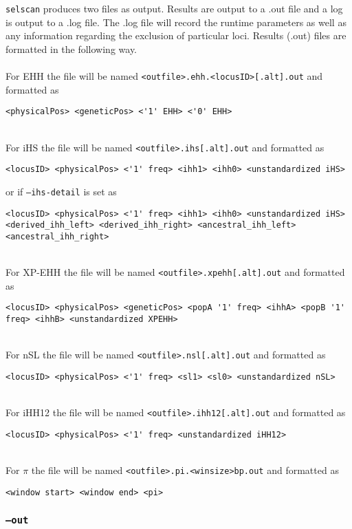 \documentclass[12pt]{article}%
\begin{document}
{\tt selscan} produces two files as output.  Results are output to a .out file and a log is output to a .log file.  The .log file will record the runtime parameters as well as any information regarding the exclusion of particular loci.  Results (.out) files are formatted in the following way.
~\\~\\
For EHH the file will be named {\tt <outfile>.ehh.<locusID>[.alt].out} and formatted as
\begin{lstlisting}
<physicalPos> <geneticPos> <'1' EHH> <'0' EHH>
\end{lstlisting}
~\\
For iHS the file will be named {\tt <outfile>.ihs[.alt].out} and formatted as
\begin{lstlisting}
<locusID> <physicalPos> <'1' freq> <ihh1> <ihh0> <unstandardized iHS>
\end{lstlisting}
or if {\tt --ihs-detail} is set as
\begin{lstlisting}
<locusID> <physicalPos> <'1' freq> <ihh1> <ihh0> <unstandardized iHS> <derived_ihh_left> <derived_ihh_right> <ancestral_ihh_left> <ancestral_ihh_right>
\end{lstlisting}
~\\
For XP-EHH the file will be named {\tt <outfile>.xpehh[.alt].out} and formatted as
\begin{lstlisting}
<locusID> <physicalPos> <geneticPos> <popA '1' freq> <ihhA> <popB '1' freq> <ihhB> <unstandardized XPEHH>
\end{lstlisting}
~\\
For nSL the file will be named {\tt <outfile>.nsl[.alt].out} and formatted as
\begin{lstlisting}
<locusID> <physicalPos> <'1' freq> <sl1> <sl0> <unstandardized nSL>
\end{lstlisting}
~\\
For iHH12 the file will be named {\tt <outfile>.ihh12[.alt].out} and formatted as
\begin{lstlisting}
<locusID> <physicalPos> <'1' freq> <unstandardized iHH12>
\end{lstlisting}
~\\
For $\pi$ the file will be named {\tt <outfile>.pi.<winsize>bp.out} and formatted as
\begin{lstlisting}
<window start> <window end> <pi> 
\end{lstlisting}

\subsubsection{{\tt --out}}
\end{document}
